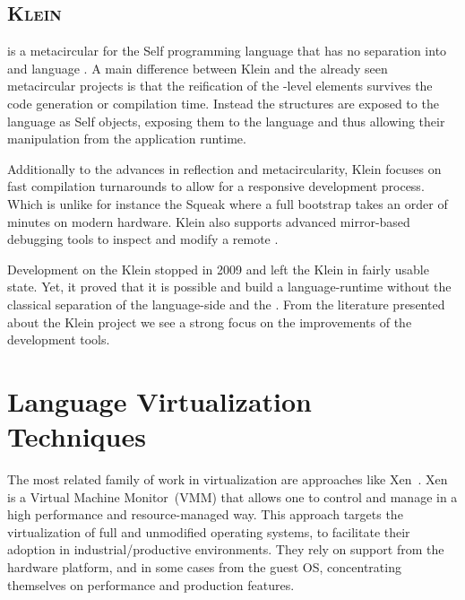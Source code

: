 \subsection*{\textsc{Klein \VM}}

 is a metacircular \VM for the Self programming language that has no separation into \VM and language \cite{Unga05a}.
A main difference between Klein and the already seen metacircular \VM projects is that the reification of the \VM-level elements survives the code generation or compilation time.
Instead the \VM structures are exposed to the language as Self objects, exposing them to the language and thus allowing their manipulation from the application runtime.

Additionally to the advances in reflection and metacircularity, Klein focuses on fast compilation turnarounds to allow for a responsive development process.
Which is unlike for instance the Squeak \VM where a full \VM bootstrap takes an order of minutes on modern hardware.
Klein also supports advanced mirror-based debugging tools to inspect and modify a remote \VM.

Development on the Klein \VM stopped in 2009 and left the Klein \VM in fairly usable state.
Yet, it proved that it is possible and build a language-runtime without the classical separation of the language-side and the \VM.
From the literature presented about the Klein project we see a strong focus on the improvements of the development tools.

\section{Language Virtualization Techniques}\label{sec:background_virtualization_techniques}

The most related family of work in virtualization are approaches like Xen~\cite{Chis07a}. Xen is a Virtual Machine Monitor~(VMM) that allows one to control and manage \VM in a high performance and resource-managed way. This approach targets the virtualization of full and unmodified operating systems, to facilitate their adoption in industrial/productive environments. They rely on support from the hardware platform, and in some cases from the guest OS, concentrating themselves on performance and production features.

